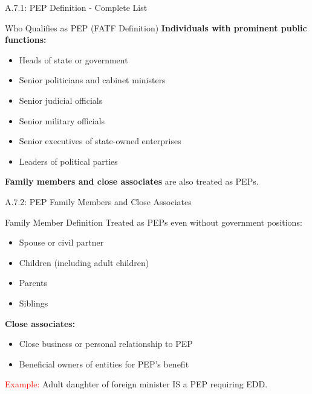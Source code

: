\documentclass{beamer}
\begin{document}
	
	\begin{frame}{A.7.1: PEP Definition - Complete List}
		\begin{block}{Who Qualifies as PEP (FATF Definition)}
			\textbf{Individuals with prominent public functions:}
			\begin{itemize}
				\item Heads of state or government
				\item Senior politicians and cabinet ministers
				\item Senior judicial officials
				\item Senior military officials
				\item Senior executives of state-owned enterprises
				\item Leaders of political parties
			\end{itemize}
			\textbf{Family members and close associates} are also treated as PEPs.
		\end{block}
	\end{frame}
	
	\begin{frame}{A.7.2: PEP Family Members and Close Associates}
		\begin{block}{Family Member Definition}
			Treated as PEPs even without government positions:
			\begin{itemize}
				\item Spouse or civil partner
				\item Children (including adult children)
				\item Parents
				\item Siblings
			\end{itemize}
			\textbf{Close associates:}
			\begin{itemize}
				\item Close business or personal relationship to PEP
				\item Beneficial owners of entities for PEP's benefit
			\end{itemize}
		\end{block}
		\textcolor{red}{Example:} Adult daughter of foreign minister IS a PEP requiring EDD.
	\end{frame}
	
\end{document}
